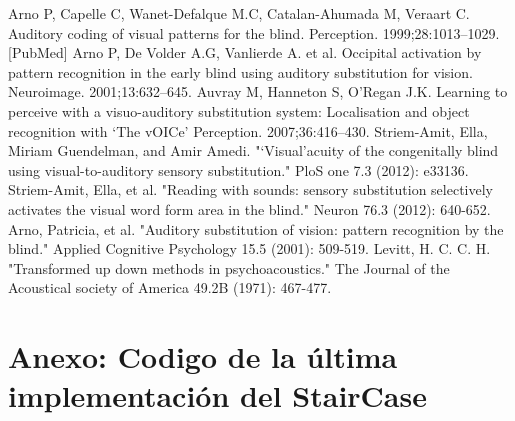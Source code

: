 \documentclass{article}
\begin{document}
\begin{thebibliography}{9}
Arno P, Capelle C, Wanet-Defalque M.C, Catalan-Ahumada M, Veraart C. Auditory coding of visual patterns for the blind. Perception. 1999;28:1013–1029. [PubMed]
Arno P, De Volder A.G, Vanlierde A. et al. Occipital activation by pattern recognition in the early blind using auditory substitution for vision. Neuroimage. 2001;13:632–645.
Auvray M, Hanneton S, O’Regan J.K. Learning to perceive with a visuo-auditory substitution system: Localisation and object recognition with ‘The vOICe’ Perception. 2007;36:416–430.
Striem-Amit, Ella, Miriam Guendelman, and Amir Amedi. "‘Visual’acuity of the congenitally blind using visual-to-auditory sensory substitution." PloS one 7.3 (2012): e33136.
Striem-Amit, Ella, et al. "Reading with sounds: sensory substitution selectively activates the visual word form area in the blind." Neuron 76.3 (2012): 640-652.
Arno, Patricia, et al. "Auditory substitution of vision: pattern recognition by the blind." Applied Cognitive Psychology 15.5 (2001): 509-519.
Levitt, H. C. C. H. "Transformed up down methods in psychoacoustics." The Journal of the Acoustical society of America 49.2B (1971): 467-477.
\end{thebibliography}


\clearpage

\section{Anexo: Codigo de la última implementación del StairCase} \label{anexo:staircase}
\end{document}
